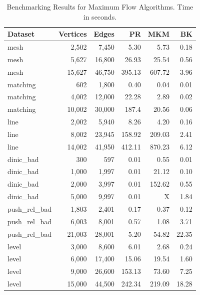 \begin{table}[H]
\centering
\begin{tabular}{lrr|rrr}
\toprule
\textbf{Dataset} & \textbf{Vertices} & \textbf{Edges} & \textbf{PR} & \textbf{MKM} & \textbf{BK} \\
\midrule
 mesh & 2,502 & 7,450 & 5.30 & 5.73 & 0.18 \\
 mesh & 5,627 & 16,800 & 26.93 & 25.54 & 0.56 \\
 mesh & 15,627 & 46,750 & 395.13 & 607.72 & 3.96 \\
\cmidrule(lr){1-6}
 matching & 602 & 1,800 & 0.40 & 0.04 & 0.01 \\
 matching & 4,002 & 12,000 & 22.28 & 2.89 & 0.02 \\
 matching & 10,002 & 30,000 & 187.4 & 20.56 & 0.06 \\
 \cmidrule(lr){1-6}
 line & 2,002 & 5,940 & 8.26 & 4.20 & 0.16\\
 line & 8,002 & 23,945 & 158.92 & 209.03 & 2.41\\
 line & 14,002 & 41,950 & 412.11 & 870.23 & 6.12 \\
\cmidrule(lr){1-6}
 dinic\_bad & 300 & 597 & 0.01 & 0.55 & 0.01 \\
 dinic\_bad & 1,000 & 1,997 & 0.01 & 21.12 & 0.10 \\
 dinic\_bad & 2,000 & 3,997 & 0.01 & 152.62 & 0.55 \\
 dinic\_bad & 5,000 & 9,997 & 0.01 & X & 1.84  \\
\cmidrule(lr){1-6}
 push\_rel\_bad & 1,803 & 2,401 & 0.17 & 0.37 & 0.12 \\
 push\_rel\_bad & 6,003 & 8,001 & 0.57 & 1.08 & 3.71 \\
 push\_rel\_bad & 21,003 & 28,001 & 5.20 & 54.82 & 22.35 \\
\cmidrule(lr){1-6}
 level & 3,000 & 8,600 & 6.01 & 2.68 & 0.24 \\
 level & 6,000 & 17,400 & 15.06 & 19.54 & 1.60 \\
 level & 9,000 & 26,600 & 153.13 & 73.60 & 7.25 \\
 level & 15,000 & 44,500 & 242.34 & 219.09 & 18.28 \\
  
\bottomrule
\end{tabular}
\caption{Benchmarking Results for Maximum Flow Algorithms. Time in seconds.}
\end{table}

